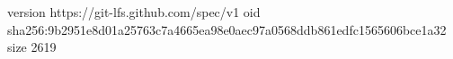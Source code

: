 version https://git-lfs.github.com/spec/v1
oid sha256:9b2951e8d01a25763c7a4665ea98e0aec97a0568ddb861edfc1565606bce1a32
size 2619
